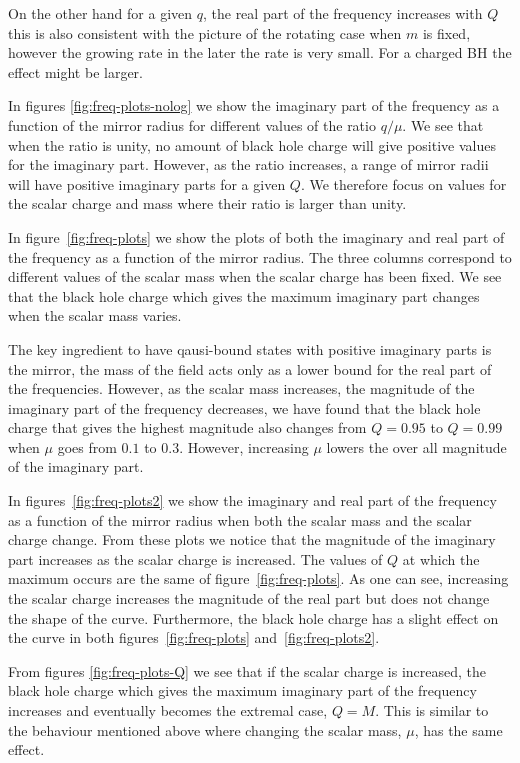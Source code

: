 \documentclass[aps, prd, twocolumn, amsmath, floats,floatfix, superscriptaddress,
nofootinbib, showpacs]{revtex4-1}
\begin{document}
On the other hand for a given $q$, the real part of the frequency increases with $Q$ this is also
consistent with the picture
of the rotating case when $m$ is fixed, however the growing rate in the later the rate is very
small. For a charged BH the effect might be larger. 


In figures \ref{fig:freq-plots-nolog} we show the imaginary part of the frequency as a function of the
mirror radius for different values of the ratio $q/\mu$.
We see that when the ratio is unity, no amount of black hole charge will give positive values
for the imaginary part.
However, as the ratio increases, a range of mirror radii will have positive imaginary parts for a given $Q$.
We therefore focus on values for the scalar charge and mass where their ratio is larger than unity.



In figure~\ref{fig:freq-plots} we show the plots of both the imaginary and real
part of the frequency as a function of the mirror radius.
The three columns correspond to different values of the scalar mass
when the scalar charge has been fixed.
We see that the black hole charge which gives the maximum imaginary part changes when the scalar mass varies.

The key ingredient to have qausi-bound states with positive
imaginary parts is the mirror, the mass of the field acts only as a lower bound for the
real part of the frequencies. However, as the scalar mass increases, the magnitude
of the imaginary part of the frequency decreases, we have found that the black hole charge
that gives the
highest magnitude also changes from $Q=0.95$ to $Q=0.99$ when $\mu$ goes from $0.1$ to $0.3$.
However, increasing $\mu$ lowers the over all magnitude of the imaginary part.


In figures~\ref{fig:freq-plots2} we show the imaginary and real
part of the frequency as a function of the mirror radius when  both the
scalar mass and the scalar charge change. From these plots we notice that the magnitude of the
imaginary part increases as the scalar charge is increased. 
The values of $Q$ at which the maximum occurs are the same of figure~\ref{fig:freq-plots}.
As one can see, increasing the scalar charge increases the magnitude of
the real part but does not change the shape of the curve.
Furthermore, the  black hole charge has a slight effect on the curve in both
figures~\ref{fig:freq-plots} and~\ref{fig:freq-plots2}.


From figures \ref{fig:freq-plots-Q} we see that if the scalar charge is increased,
the black hole charge which gives the maximum imaginary part of the frequency
increases and eventually becomes the extremal case, $Q=M$.
This is similar to the behaviour mentioned above where changing the scalar mass, $\mu$, has the same effect.
\end{document}

